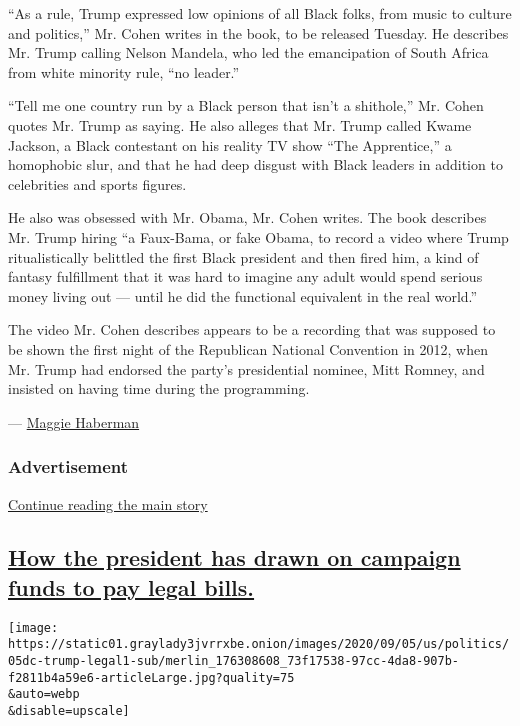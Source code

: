 ``As a rule, Trump expressed low opinions of all Black folks, from music
to culture and politics,'' Mr. Cohen writes in the book, to be released
Tuesday. He describes Mr. Trump calling Nelson Mandela, who led the
emancipation of South Africa from white minority rule, ``no leader.''

``Tell me one country run by a Black person that isn't a shithole,'' Mr.
Cohen quotes Mr. Trump as saying. He also alleges that Mr. Trump called
Kwame Jackson, a Black contestant on his reality TV show ``The
Apprentice,'' a homophobic slur, and that he had deep disgust with Black
leaders in addition to celebrities and sports figures.

He also was obsessed with Mr. Obama, Mr. Cohen writes. The book
describes Mr. Trump hiring ``a Faux-Bama, or fake Obama, to record a
video where Trump ritualistically belittled the first Black president
and then fired him, a kind of fantasy fulfillment that it was hard to
imagine any adult would spend serious money living out --- until he did
the functional equivalent in the real world.''

The video Mr. Cohen describes appears to be a recording that was
supposed to be shown the first night of the Republican National
Convention in 2012, when Mr. Trump had endorsed the party's presidential
nominee, Mitt Romney, and insisted on having time during the
programming.

--- \href{https://www.nytimes3xbfgragh.onion/by/maggie-haberman}{Maggie
Haberman}

\hypertarget{advertisement-3}{%
\subsubsection{Advertisement}\label{advertisement-3}}

\protect\hyperlink{after-dfp-ad-mid4}{Continue reading the main story}

\hypertarget{how-the-president-has-drawn-on-campaign-funds-to-pay-legal-bills}{%
\subsection{\texorpdfstring{\protect\hyperlink{how-the-president-has-drawn-on-campaign-funds-to-pay-legal-bills}{How
the president has drawn on campaign funds to pay legal
bills.}}{How the president has drawn on campaign funds to pay legal bills.}}\label{how-the-president-has-drawn-on-campaign-funds-to-pay-legal-bills}}

\texttt{[image: https://static01.graylady3jvrrxbe.onion/images/2020/09/05/us/politics/05dc-trump-legal1-sub/merlin\_176308608\_73f17538-97cc-4da8-907b-f2811b4a59e6-articleLarge.jpg?quality=75\\\&auto=webp\\\&disable=upscale]}

